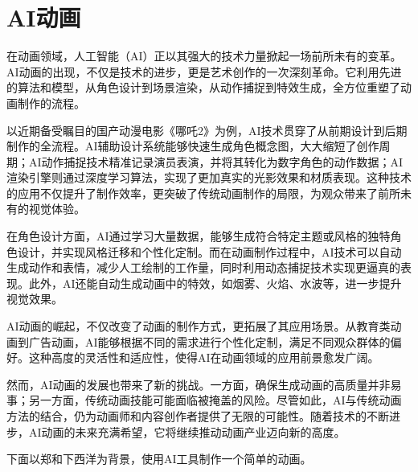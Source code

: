 \section{AI动画}

在动画领域，人工智能（AI）正以其强大的技术力量掀起一场前所未有的变革。AI动画的出现，不仅是技术的进步，更是艺术创作的一次深刻革命。它利用先进的算法和模型，从角色设计到场景渲染，从动作捕捉到特效生成，全方位重塑了动画制作的流程。

以近期备受瞩目的国产动漫电影《哪吒2》为例，AI技术贯穿了从前期设计到后期制作的全流程。AI辅助设计系统能够快速生成角色概念图，大大缩短了创作周期；AI动作捕捉技术精准记录演员表演，并将其转化为数字角色的动作数据；AI渲染引擎则通过深度学习算法，实现了更加真实的光影效果和材质表现。这种技术的应用不仅提升了制作效率，更突破了传统动画制作的局限，为观众带来了前所未有的视觉体验。

在角色设计方面，AI通过学习大量数据，能够生成符合特定主题或风格的独特角色设计，并实现风格迁移和个性化定制。而在动画制作过程中，AI技术可以自动生成动作和表情，减少人工绘制的工作量，同时利用动态捕捉技术实现更逼真的表现。此外，AI还能自动生成动画中的特效，如烟雾、火焰、水波等，进一步提升视觉效果。

AI动画的崛起，不仅改变了动画的制作方式，更拓展了其应用场景。从教育类动画到广告动画，AI能够根据不同的需求进行个性化定制，满足不同观众群体的偏好。这种高度的灵活性和适应性，使得AI在动画领域的应用前景愈发广阔。

然而，AI动画的发展也带来了新的挑战。一方面，确保生成动画的高质量并非易事；另一方面，传统动画技能可能面临被掩盖的风险。尽管如此，AI与传统动画方法的结合，仍为动画师和内容创作者提供了无限的可能性。随着技术的不断进步，AI动画的未来充满希望，它将继续推动动画产业迈向新的高度。

下面以郑和下西洋为背景，使用AI工具制作一个简单的动画。



